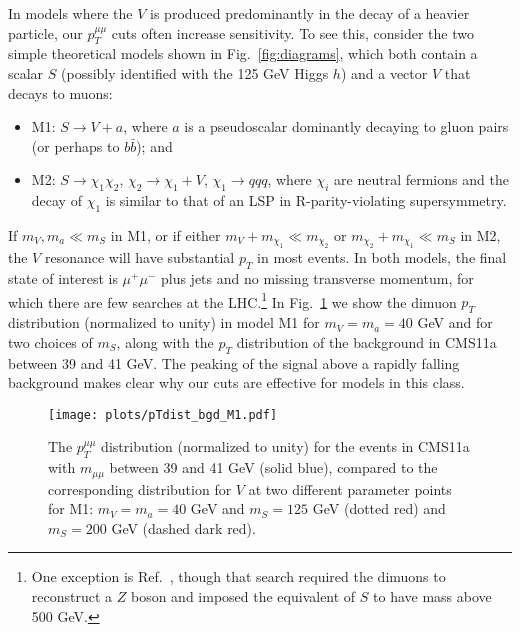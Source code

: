 \documentclass[aps,prd,twocolumn,superscriptaddress,preprintnumbers,nofootinbib,longbibliography,floatfix]{revtex4-1}
\newcommand{\ptmm}{p_T^{\mu\mu}}
\DeclareRobustCommand{\Fig}[1]{Fig.~\ref{#1}}
\DeclareRobustCommand{\Ref}[1]{Ref.~\cite{#1}}
\begin{document}
In models where the $V$ is produced predominantly in the decay of a heavier particle, our $\ptmm$ cuts often increase sensitivity.
%
To see this, consider the two simple theoretical models shown in \Fig{fig:diagrams}, which both contain a scalar $S$ (possibly identified with the 125 GeV Higgs $h$) and a vector $V$ that decays to muons:
%
\begin{itemize}
%
\item M1:  $S\to V+a$, where $a$ is a pseudoscalar dominantly decaying to gluon pairs (or perhaps to $b\bar b$); and
%
\item M2:  $S\to \chi_1\chi_2$, $\chi_2\to \chi_1+V$, $\chi_1\to qqq$, where $\chi_i$ are neutral fermions and the decay of $\chi_1$ is similar to that of an LSP in R-parity-violating supersymmetry. 
%
\end{itemize}
%
If $m_V,m_a\ll m_S$ in M1, or if either $m_V+m_{\chi_1} \ll m_{\chi_2}$ or $m_{\chi_2}+m_{\chi_1}\ll m_S$ in M2, the $V$ resonance will have substantial $p_T$ in most events.
%
In both models, the final state of interest is $\mu^+\mu^-$ plus jets and no missing transverse momentum, for which there are few searches at the LHC.\footnote{One exception is \Ref{Chatrchyan:2012tw}, though that search required the dimuons to reconstruct a $Z$ boson and imposed the equivalent of $S$ to have mass above 500 GeV.}
%
In \Fig{fig:pt_signals_vs_bkgd} we show the dimuon $p_T$ distribution (normalized to unity) in model M1 for $m_V=m_a=40$ GeV and for two choices of $m_S$, along with the $p_T$ distribution of the background in CMS11a between 39 and 41 GeV.  
%
The peaking of the signal above a rapidly falling background makes clear why our cuts are effective for models in this class.


%
\begin{figure}[t]  
\begin{center}  
\leavevmode
\vskip 0.0in
\texttt{[image: plots/pTdist\_bgd\_M1.pdf]}
\end{center}
\vskip -0.20in  
\caption{The $\ptmm$ distribution (normalized to unity) for the events in CMS11a with $m_{\mu\mu}$ between 39 and 41 GeV (solid blue), compared to the corresponding distribution for $V$ at two different parameter points for M1: $m_V=m_a=40$ GeV and $m_S=125$ GeV (dotted red) and $m_S=200$ GeV (dashed dark red).}
\label{fig:pt_signals_vs_bkgd}
\end{figure}
\end{document}
